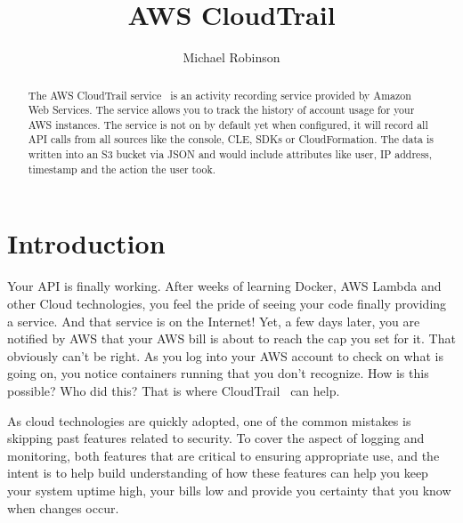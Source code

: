 
\title{AWS CloudTrail}

\author{Michael Robinson}


\renewcommand{\shortauthors}{M. Robinson}


\begin{abstract}
The AWS CloudTrail service~\cite{hid-sp18-518-CloudTrail} is an activity 
recording service provided by Amazon Web Services. The service allows you to 
track the history of account usage for your AWS instances. The service is not 
on by default yet when configured, it will record all API calls from all 
sources like the console, CLE, SDKs or CloudFormation. The data is written 
into an S3 bucket via JSON and would include attributes like user, IP address, 
timestamp and the action the user took.
\end{abstract}


\maketitle

\section{Introduction}

Your API is finally working. After weeks of learning Docker, AWS Lambda and 
other Cloud technologies, you feel the pride of seeing your code finally 
providing a service. And that service is on the Internet! Yet, a few days 
later, you are notified by AWS that your AWS bill is about to reach the cap 
you set for it. That obviously can’t be right. As you log into your AWS 
account to check on what is going on, you notice containers running that you 
don’t recognize. How is this possible? Who did this? That is where 
CloudTrail~\cite{hid-sp18-518-CloudTrail} can help.

As cloud technologies are quickly adopted, one of the common mistakes is 
skipping past features related to security. To cover the aspect of
logging and monitoring, both features that are critical to ensuring 
appropriate use, and the intent is to help build understanding of how these 
features can help you keep your system uptime high, your bills low and provide 
you certainty that you know when changes occur.

